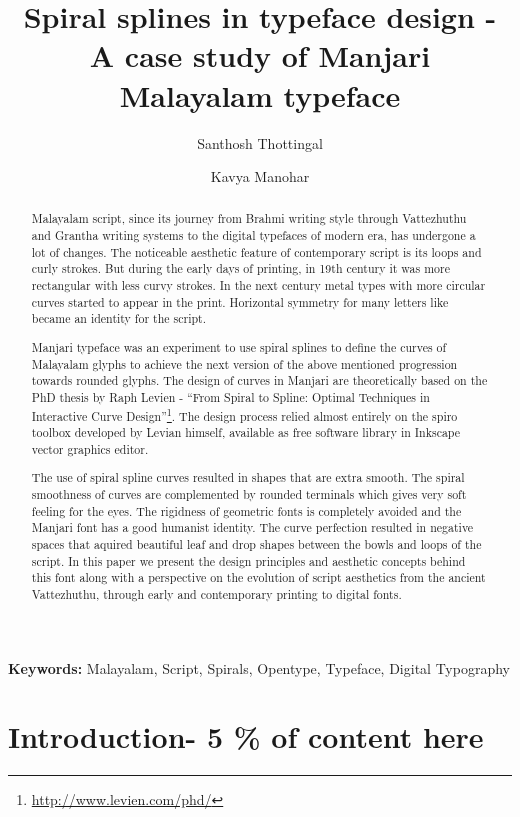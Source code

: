 \documentclass[10pt]{article}
\title{Spiral splines in typeface design - A case study of Manjari Malayalam typeface}
\author{ 
 Santhosh Thottingal
  \and
 Kavya Manohar
}
\begin{document}
\maketitle

\begin{abstract}

Malayalam script, since its journey from Brahmi writing style through Vattezhuthu and Grantha writing systems to the digital typefaces of modern era, has undergone a lot of changes. The noticeable aesthetic feature of contemporary script is its loops and curly strokes. But during the early days of printing, in 19th century it was more rectangular with less curvy strokes. In the next century metal types with more circular curves started to appear in the print. Horizontal symmetry for many letters like {} became an identity for the script.

Manjari typeface was an experiment to use spiral splines to define the curves of Malayalam glyphs to achieve the next version of the above mentioned progression towards rounded glyphs. The design of curves in Manjari are theoretically based on the PhD thesis by Raph Levien - “From Spiral to Spline: Optimal Techniques in Interactive Curve Design”\footnote{\url{http://www.levien.com/phd/}}. The design process relied almost entirely on the spiro toolbox developed  by Levian himself, available as free software library in Inkscape vector graphics editor.

The use of spiral spline curves resulted in shapes that are extra smooth. The spiral smoothness of curves are complemented by rounded terminals which gives very soft feeling for the eyes. The rigidness of geometric fonts is completely avoided and  the Manjari font has a good humanist identity. The curve perfection resulted in negative spaces that aquired beautiful leaf and drop shapes between the bowls and loops of the script.
In this paper we present the design principles and aesthetic concepts behind this font along with a perspective on the evolution of script aesthetics from the ancient Vattezhuthu, through early and contemporary printing to digital fonts.
\end{abstract}
 \textbf{Keywords:} Malayalam, Script, Spirals, Opentype, Typeface, Digital Typography

\section{Introduction- 5 \% of content here}
\end{document}
